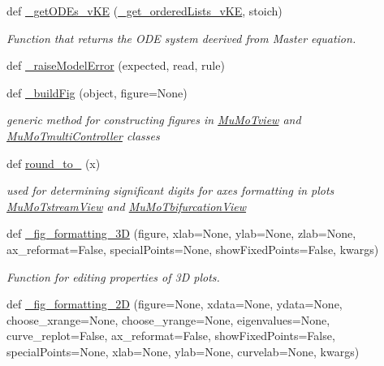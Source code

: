 \begin{DoxyCompactItemize}
def \hyperlink{namespace_mu_mo_t_1_1_mu_mo_t_a3154d6b17ff15c26a8da56b5fe48a1f1}{\+\_\+get\+O\+D\+Es\+\_\+v\+KE} (\hyperlink{namespace_mu_mo_t_1_1_mu_mo_t_aa4d9e72bb9834df8dc09115a251c1973}{\+\_\+get\+\_\+ordered\+Lists\+\_\+v\+KE}, stoich)
\begin{DoxyCompactList}\small\item\em Function that returns the O\+DE system deerived from Master equation. \end{DoxyCompactList}\item 
def \hyperlink{namespace_mu_mo_t_1_1_mu_mo_t_a63a6213e268cff48055b330d7dd9e272}{\+\_\+raise\+Model\+Error} (expected, read, rule)
\item 
def \hyperlink{namespace_mu_mo_t_1_1_mu_mo_t_aada27c31be7a76cff44cfae711dcfec1}{\+\_\+build\+Fig} (object, figure=None)
\begin{DoxyCompactList}\small\item\em generic method for constructing figures in \hyperlink{class_mu_mo_t_1_1_mu_mo_t_1_1_mu_mo_tview}{Mu\+Mo\+Tview} and \hyperlink{class_mu_mo_t_1_1_mu_mo_t_1_1_mu_mo_tmulti_controller}{Mu\+Mo\+Tmulti\+Controller} classes \end{DoxyCompactList}\item 
def \hyperlink{namespace_mu_mo_t_1_1_mu_mo_t_a846433b0fc666c4874249f87f1dcc26f}{round\+\_\+to\+\_} (x)
\begin{DoxyCompactList}\small\item\em used for determining significant digits for axes formatting in plots \hyperlink{class_mu_mo_t_1_1_mu_mo_t_1_1_mu_mo_tstream_view}{Mu\+Mo\+Tstream\+View} and \hyperlink{class_mu_mo_t_1_1_mu_mo_t_1_1_mu_mo_tbifurcation_view}{Mu\+Mo\+Tbifurcation\+View} \end{DoxyCompactList}\item 
def \hyperlink{namespace_mu_mo_t_1_1_mu_mo_t_a2748e3bdfa70e8269681135256afc7b5}{\+\_\+fig\+\_\+formatting\+\_\+3D} (figure, xlab=None, ylab=None, zlab=None, ax\+\_\+reformat=False, special\+Points=None, show\+Fixed\+Points=False, kwargs)
\begin{DoxyCompactList}\small\item\em Function for editing properties of 3D plots. \end{DoxyCompactList}\item 
def \hyperlink{namespace_mu_mo_t_1_1_mu_mo_t_a60305dc657e88574bde40c257cc93399}{\+\_\+fig\+\_\+formatting\+\_\+2D} (figure=None, xdata=None, ydata=None, choose\+\_\+xrange=None, choose\+\_\+yrange=None, eigenvalues=None, curve\+\_\+replot=False, ax\+\_\+reformat=False, show\+Fixed\+Points=False, special\+Points=None, xlab=None, ylab=None, curvelab=None, kwargs)

\end{DoxyCompactItemize}
